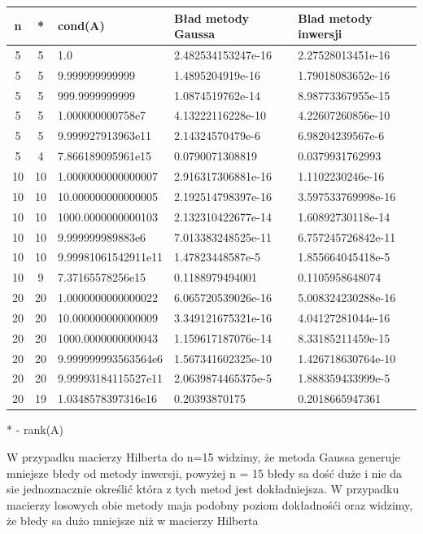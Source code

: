 \documentclass{article} %
\begin{document}
		\begin{tabularx}{\textwidth}{|c|c|X|X|X|}
		\hline
		\textbf{n} & \textbf{*} & \textbf{cond(A)}  & \textbf{Bład metody Gaussa} & \textbf{Blad metody inwersji}\\ \hline
		5 & 5 & 1.0 & 2.482534153247e-16 & 2.27528013451e-16\\ \hline
		5 & 5 & 9.999999999999 & 1.4895204919e-16 & 1.79018083652e-16\\ \hline
		5 & 5 & 999.9999999999 & 1.0874519762e-14 & 8.98773367955e-15\\ \hline
		5 & 5 & 1.000000000758e7 & 4.13222116228e-10 & 4.22607260856e-10\\ \hline
		5 & 5 & 9.999927913963e11 & 2.14324570479e-6 & 6.98204239567e-6\\ \hline
		5 & 4 & 7.866189095961e15 & 0.0790071308819 & 0.0379931762993\\ \hline
		10 & 10 & 1.0000000000000007 & 2.916317306881e-16 & 1.1102230246e-16\\ \hline
		10 & 10 & 10.000000000000005 & 2.192514798397e-16 & 3.597533769998e-16\\ \hline
		10 & 10 & 1000.0000000000103 & 2.132310422677e-14 & 1.60892730118e-14\\ \hline
		10 & 10 & 9.999999989883e6 & 7.013383248525e-11 & 6.757245726842e-11\\ \hline
		10 & 10 & 9.99981061542911e11 & 1.47823448587e-5 & 1.855664045418e-5\\ \hline
		10 & 9 & 7.37165578256e15 & 0.1188979494001 & 0.1105958648074\\ \hline
		20 & 20 & 1.0000000000000022 & 6.065720539026e-16 & 5.008324230288e-16\\ \hline
		20 & 20 & 10.000000000000009 & 3.349121675321e-16 & 4.04127281044e-16\\ \hline
		20 & 20 & 1000.0000000000043 & 1.159617187076e-14 & 8.33185211459e-15\\ \hline
		20 & 20 & 9.999999993563564e6 & 1.567341602325e-10 & 1.426718630764e-10\\ \hline
		20 & 20 & 9.99993184115527e11 & 2.0639874465375e-5 & 1.888359433999e-5\\ \hline
		20 & 19 & 1.0348578397316e16 & 0.20393870175 & 0.2018665947361\\ \hline
		\end{tabularx}
		* - rank(A)
		
		\vspace{0.3cm}

		W przypadku macierzy Hilberta do n=15 widzimy, że metoda Gaussa generuje mniejsze błedy od metody inwersji, powyżej n = 15 błedy sa dość duże i nie da sie jednoznacznie określić która z tych metod jest dokładniejsza. W przypadku macierzy losowych obie metody maja podobny poziom dokładnośći oraz widzimy,  że błedy sa dużo mniejsze niż w macierzy Hilberta
\end{document}
